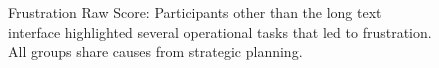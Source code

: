 \begin{figure} %
    \centering
    \captionsetup{width=0.9\linewidth, justification=justified}
    \caption{Frustration Raw Score: Participants other than the long text interface highlighted several operational tasks that led to frustration. All groups share causes from strategic planning.}
    \label{fig:frustration_cog_score}
\end{figure}



